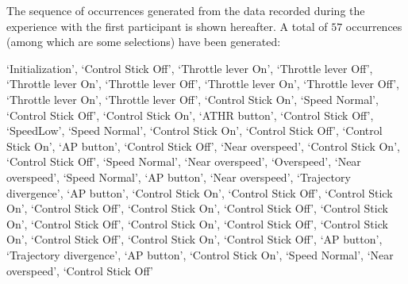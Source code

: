 The sequence of occurrences 
generated from the data 
recorded during the experience 
with the first participant 
is shown hereafter. 
A total of $57$ occurrences 
(among which are some selections) 
have been generated:

\begin{footnotesize}
`Initialization', `Control Stick Off', `Throttle lever On', `Throttle lever Off', `Throttle lever On', `Throttle lever Off', `Throttle lever On', `Throttle lever Off', `Throttle lever On', `Throttle lever Off', `Control Stick On', `Speed Normal', `Control Stick Off', `Control Stick On', `ATHR button', `Control Stick Off', `SpeedLow', `Speed Normal', `Control Stick On', `Control Stick Off', `Control Stick On', `AP button', `Control Stick Off', `Near overspeed', `Control Stick On', `Control Stick Off', `Speed Normal', `Near overspeed', `Overspeed', `Near overspeed', `Speed Normal', `AP button', `Near overspeed', `Trajectory divergence',  `AP button', `Control Stick On',  `Control Stick Off', `Control Stick On', `Control Stick Off', `Control Stick On', `Control Stick Off', `Control Stick On', `Control Stick Off', `Control Stick On', `Control Stick Off', `Control Stick On', `Control Stick Off', `Control Stick On', `Control Stick Off', `AP button', `Trajectory divergence', `AP button', `Control Stick On', `Speed Normal', `Near overspeed', `Control Stick Off'
\end{footnotesize}



